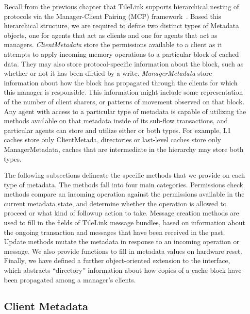 Recall from the previous chapter that TileLink supports hierarchical nesting of protocols via the Manager-Client Pairing (MCP) framework~\cite{beu2011manager}.
Based this hierarchical structure, we are required to define two distinct types of Metadata objects,
one for agents that act as clients and one for agents that act as managers.
\emph{ClientMetadata} store the permissions available to a client as it attempts to 
apply incoming memory operations to a particular block of cached data.
They may also store protocol-specific information about the block, such as whether or not it has been dirtied by a write.
\emph{ManagerMetadata} store information about how the block has propagated through the clients for which this manager is responsible.
This information might include some representation of the number of client sharers, or patterns of movement observed on that block.
Any agent with access to a particular type of metadata is capable of utilizing the methods
available on that metadata inside of its sub-flow transactions,
and particular agents can store and utilize either or both types.
For example, L1 caches store only ClientMetada, directories or last-level caches store only ManagerMetadata,
caches that are intermediate in the hierarchy may store both types.

The following subsections delineate the specific methods that we provide on each type of metadata.
The methods fall into four main categories.
Permissions check methods compare an incoming operation against the permissions available in the current metadata state, and determine
whether the operation is allowed to proceed or what kind of followup action to take.
Message creation methods are used to fill in the fields of TileLink message bundles, based on information about the ongoing transaction
and messages that have been received in the past.
Update methods mutate the metadata in response to an incoming operation or message.
We also provide functions to fill in metadata values on hardware reset.
Finally, we have defined a further object-oriented extension to the interface, which abstracts ``directory'' information about how copies of
a cache block have been propagated among a manager's clients.

\subsection{Client Metadata} 

